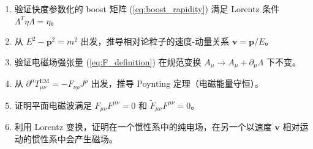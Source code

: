 \begin{enumerate}
    \item 验证快度参数化的 boost 矩阵 (\ref{eq:boost_rapidity}) 满足 Lorentz 条件 $\Lambda^T\eta\Lambda = \eta$。
    \item 从 $E^2 - \mathbf{p}^2 = m^2$ 出发，推导相对论粒子的速度-动量关系 $\mathbf{v} = \mathbf{p}/E$。
    \item 验证电磁场强张量 (\ref{eq:F_definition}) 在规范变换 $A_\mu \to A_\mu + \partial_\mu\Lambda$ 下不变。
    \item 从 $\partial^\mu T^{\text{EM}}_{\mu\nu} = -F_{\nu\rho}J^\rho$ 出发，推导 Poynting 定理（电磁能量守恒）。
    \item 证明平面电磁波满足 $F_{\mu\nu}F^{\mu\nu} = 0$ 和 $\tilde{F}_{\mu\nu}F^{\mu\nu} = 0$。
    \item 利用 Lorentz 变换，证明在一个惯性系中的纯电场，在另一个以速度 $\mathbf{v}$ 相对运动的惯性系中会产生磁场。
\end{enumerate}
